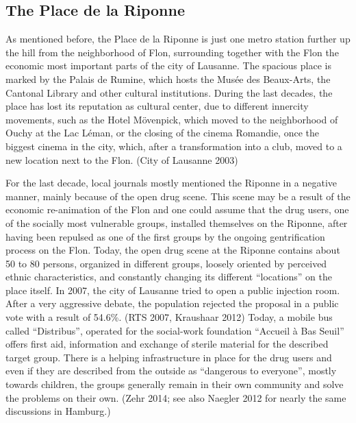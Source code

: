 \documentclass[a4paper,
fontsize=11pt,
oneside,
numbers=noperiodatend,
parskip=half-,
bibliography=totoc,
final
]{scrartcl}
\begin{document}
\subsection{The Place de la Riponne}\label{the-place-de-la-riponne}

As mentioned before, the Place de la Riponne is just one metro station
further up the hill from the neighborhood of Flon, surrounding together
with the Flon the economic most important parts of the city of Lausanne.
The spacious place is marked by the Palais de Rumine, which hosts the
Musée des Beaux-Arts, the Cantonal Library and other cultural
institutions. During the last decades, the place has lost its reputation
as cultural center, due to different innercity movements, such as the
Hotel Mövenpick, which moved to the neighborhood of Ouchy at the Lac
Léman, or the closing of the cinema Romandie, once the biggest cinema in
the city, which, after a transformation into a club, moved to a new
location next to the Flon. (City of Lausanne 2003)

For the last decade, local journals mostly mentioned the Riponne in a
negative manner, mainly because of the open drug scene. This scene may
be a result of the economic re-animation of the Flon and one could
assume that the drug users, one of the socially most vulnerable groups,
installed themselves on the Riponne, after having been repulsed as one
of the first groups by the ongoing gentrification process on the Flon.
Today, the open drug scene at the Riponne contains about 50 to 80
persons, organized in different groups, loosely oriented by perceived
ethnic characteristics, and constantly changing its different
\enquote{locations} on the place itself. In 2007, the city of Lausanne
tried to open a public injection room. After a very aggressive debate,
the population rejected the proposal in a public vote with a result of
54.6\%. (RTS 2007, Kraushaar 2012) Today, a mobile bus called
\enquote{Distribus}, operated for the social-work foundation
\enquote{Accueil à Bas Seuil} offers first aid, information and exchange
of sterile material for the described target group. There is a helping
infrastructure in place for the drug users and even if they are
described from the outside as \enquote{dangerous to everyone}, mostly
towards children, the groups generally remain in their own community and
solve the problems on their own. (Zehr 2014; see also Naegler 2012 for
nearly the same discussions in Hamburg.)
\end{document}
